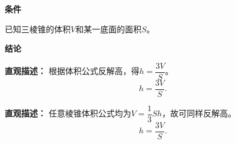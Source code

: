 \begin{statementbox}

	\textbf{\textcolor{CStatement}{条件}}
	\begin{description}[style=nextline, leftmargin=2.8em, labelsep=0.5em, itemsep=0.35em]
		\item[\textbf{\textcolor{CStatement}{条件1（已知体积底面积）：}}] 已知三棱锥的体积$V$和某一底面的面积$S$。
	\end{description}

	\textbf{\textcolor{CStatement}{结论}}
	\begin{description}[style=nextline, leftmargin=2.8em, labelsep=0.5em, itemsep=0.45em]
		\item[\textbf{\textcolor{CStatement}{结论一（等体积法求高）：}}]
			\textbf{\textcolor{CStatement}{直观描述：}}
			根据体积公式反解高，得$h=\dfrac{3V}{S}$。
			\[
				h = \frac{3V}{S}.
			\]

		\item[\textbf{\textcolor{CStatement}{推广结论（棱锥通用公式）：}}]
			\textbf{\textcolor{CStatement}{直观描述：}}
			任意棱锥体积公式均为$V=\dfrac13Sh$，故可同样反解高。
			\[
				h = \frac{3V}{S}.
			\]
	\end{description}

\end{statementbox}
